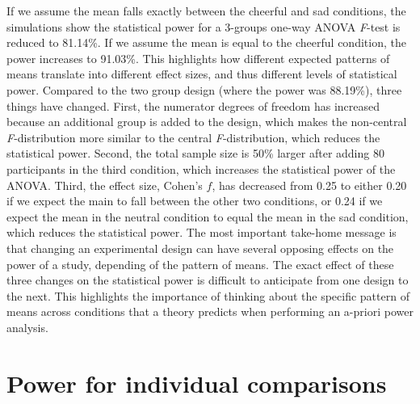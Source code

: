 \documentclass[
  english,
  ,jou,floatsintext]{apa6}
\begin{document}
If we assume the mean falls exactly between the cheerful and sad conditions, the simulations show the statistical power for a 3-groups one-way ANOVA \emph{F}-test is reduced to 81.14\%.
If we assume the mean is equal to the cheerful condition, the power increases to 91.03\%.
This highlights how different expected patterns of means translate into different effect sizes, and thus different levels of statistical power.
Compared to the two group design (where the power was 88.19\%), three things have changed.
First, the numerator degrees of freedom has increased because an additional group is added to the design, which makes the non-central \emph{F}-distribution more similar to the central \emph{F}-distribution, which reduces the statistical power.
Second, the total sample size is 50\% larger after adding 80 participants in the third condition, which increases the statistical power of the ANOVA.
Third, the effect size, Cohen's \(f\), has decreased from 0.25 to either 0.20 if we expect the main to fall between the other two conditions, or 0.24 if we expect the mean in the neutral condition to equal the mean in the sad condition, which reduces the statistical power.
The most important take-home message is that changing an experimental design can have several opposing effects on the power of a study, depending of the pattern of means.
The exact effect of these three changes on the statistical power is difficult to anticipate from one design to the next.
This highlights the importance of thinking about the specific pattern of means across conditions that a theory predicts when performing an a-priori power analysis.

\hypertarget{power-for-individual-comparisons}{%
\section{Power for individual comparisons}\label{power-for-individual-comparisons}}
\end{document}
